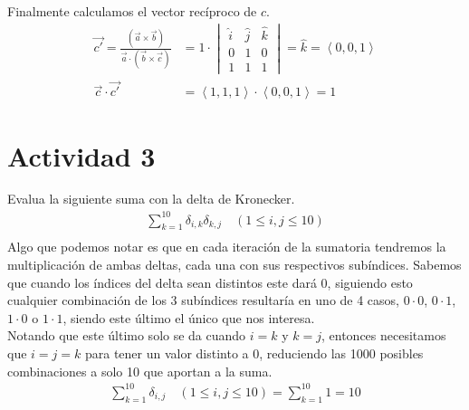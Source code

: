 \documentclass{article}
\newcommand{\custvec}[1]{\left\langle#1\right\rangle}
\begin{document}
Finalmente calculamos el vector recíproco de $c$.
\begin{equation*}
    \begin{split}
        \vec{c'} = \frac{(\vec{a}\times \vec{b})}{\vec{a}\cdot (\vec{b}\times \vec{c})} &= 1\cdot \begin{vmatrix}
        \hat{i} & \hat{j} & \hat{k} \\
        0 & 1 & 0 \\
        1 & 1 & 1
        \end{vmatrix} = \hat{k} = \custvec{0,0,1}\\
        \vec{c}\cdot \vec{c'} &= \custvec{1,1,1}\cdot \custvec{0,0,1} = 1 
    \end{split}
\end{equation*}
\newpage
\section{Actividad 3}
Evalua la siguiente suma con la delta de Kronecker.\\
\begin{equation*}
    \begin{split}
        \sum\limits_{k=1}^{10} \delta_{i,k}\delta_{k,j}\quad(1\leqslant i,j \leqslant 10)\\
    \end{split}
\end{equation*}
Algo que podemos notar es que en cada iteración de la sumatoria tendremos la multiplicación de ambas deltas, cada una con sus respectivos subíndices. Sabemos que cuando los índices del delta sean distintos este dará 0, siguiendo esto cualquier combinación de los 3 subíndices resultaría en uno de 4 casos, $0\cdot 0$, $0\cdot 1$, $1\cdot 0$ o $1\cdot1$, siendo este último el único que nos interesa.\\

Notando que este último solo se da cuando $i=k$ y $k=j$, entonces necesitamos que $i=j=k$ para tener un valor distinto a 0, reduciendo las 1000 posibles combinaciones a solo 10 que aportan a la suma.\\
\begin{equation*}
    \begin{split}
        \sum\limits_{k=1}^{10}\delta_{i,j}\quad (1\leqslant i,j \leqslant 10) = \sum\limits_{k=1}^{10}1 = 10\\
    \end{split}
\end{equation*}
\newpage
\end{document}
